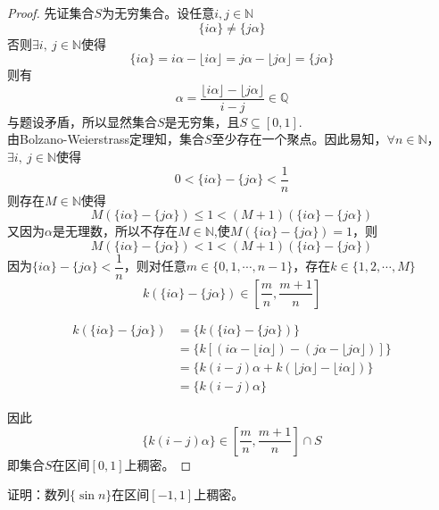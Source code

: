 \begin{proof}

    先证集合$S$为无穷集合。设任意$i,j \in \mathbb{N}$
    $$\{i\alpha\} \neq \{j\alpha\}$$
    否则$\exists i,\ j \in \mathbb{N}$使得
    $$\{i\alpha\} = i\alpha - \lfloor i\alpha \rfloor = j\alpha - \lfloor j\alpha \rfloor = \{j\alpha\}$$
    则有
    $$\alpha = \dfrac{\lfloor i\alpha \rfloor - \lfloor j\alpha \rfloor}{i - j} \in \mathbb{Q}$$
    与题设矛盾，所以显然集合$S$是无穷集，且$S \subseteq [0, 1]$. \\
    由\textup{Bolzano-Weierstrass}定理知，集合$S$至少存在一个聚点。因此易知，$\forall n \in \mathbb{N}$，$\exists i,\ j \in \mathbb{N}$使得
    $$0 < \{i\alpha\} - \{j\alpha\} < \dfrac{1}{n}$$
    则存在$M \in \mathbb{N}$使得
    $$M(\{i\alpha\} - \{j\alpha\}) \leq 1 < (M + 1)(\{i\alpha\} - \{j\alpha\})$$
    又因为$\alpha$是无理数，所以不存在$M \in \mathbb{N}$,使$M(\{i\alpha\} - \{j\alpha\}) = 1$，则
    $$M(\{i\alpha\} - \{j\alpha\}) < 1 < (M + 1)(\{i\alpha\} - \{j\alpha\})$$
    因为$\{i\alpha\} - \{j\alpha\} < \dfrac{1}{n}$，则对任意$m \in \{0, 1, \cdots, n - 1\}$，存在$k \in \{1, 2, \cdots, M\}$
    $$k(\{i\alpha\} - \{j\alpha\}) \in \left[ \dfrac{m}{n}, \dfrac{m + 1}{n} \right]$$

    \begin{align*}
        k (\{ i \alpha \} - \{ j \alpha \}) & = \{ k (\{ i \alpha \} - \{ j \alpha \}) \} \\
        & = \{ k [(i \alpha - \lfloor i \alpha \rfloor) - (j \alpha - \lfloor j \alpha \rfloor)] \} \\
        & = \{ k (i - j) \alpha + k (\lfloor j \alpha \rfloor - \lfloor i \alpha \rfloor) \} \\
        & = \{ k (i - j) \alpha \}
    \end{align*}

    因此
    $$\{ k (i - j) \alpha \} \in \! \left[ \dfrac{m}{n},\dfrac{m + 1}{n} \right] \cap S$$
    即集合$S$在区间$[0,1]$上稠密。

\end{proof}

\begin{proposition}

    证明：数列$\{\sin{n}\}$在区间$[-1, 1]$上稠密。

\end{proposition}

